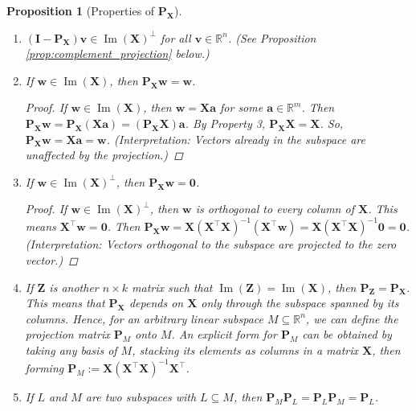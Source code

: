 \documentclass[11pt, a4paper]{article}
\DeclareMathOperator{\Image}{\mathrm{Im}}        %
\newtheorem{proposition}[theorem]{Proposition}
\theoremstyle{definition}
\theoremstyle{remark}
\newcommand{\RR}{\mathbb{R}}             %
\newcommand{\mat}[1]{\mathbf{#1}}       %
\newcommand{\vect}[1]{\bm{#1}}          %
\newcommand{\transpose}{^{\top}}        %
\begin{document}
\begin{proposition}[Properties of $\mat{P}_{\mat{X}}$]
\begin{enumerate}
\begin{proof}
        (Interpretation: If the columns of $\mat{X}$ span the entire space $\RR^n$, projecting onto that space leaves every vector unchanged.)
        \end{proof}
    \item $(\mat{I} - \mat{P}_{\mat{X}}) \vect{v} \in \Image(\mat{X})^{\perp}$ for all $\vect{v} \in \RR^n$. (See Proposition \ref{prop:complement_projection} below.)
    \item If $\vect{w} \in \Image(\mat{X})$, then $\mat{P}_{\mat{X}} \vect{w} = \vect{w}$.
        \begin{proof} %
        If $\vect{w} \in \Image(\mat{X})$, then $\vect{w} = \mat{X}\vect{a}$ for some $\vect{a} \in \RR^m$. Then $\mat{P}_{\mat{X}}\vect{w} = \mat{P}_{\mat{X}}(\mat{X}\vect{a}) = (\mat{P}_{\mat{X}}\mat{X})\vect{a}$. By Property 3, $\mat{P}_{\mat{X}}\mat{X} = \mat{X}$. So, $\mat{P}_{\mat{X}}\vect{w} = \mat{X}\vect{a} = \vect{w}$.
        (Interpretation: Vectors already in the subspace are unaffected by the projection.)
        \end{proof} %
    \item If $\vect{w} \in \Image(\mat{X})^{\perp}$, then $\mat{P}_{\mat{X}} \vect{w} = \vect{0}$.
        \begin{proof} If $\vect{w} \in \Image(\mat{X})^{\perp}$, then $\vect{w}$ is orthogonal to every column of $\mat{X}$. This means $\mat{X}\transpose \vect{w} = \vect{0}$. Then $\mat{P}_{\mat{X}}\vect{w} = \mat{X} (\mat{X}\transpose \mat{X})^{-1} (\mat{X}\transpose \vect{w}) = \mat{X} (\mat{X}\transpose \mat{X})^{-1} \vect{0} = \vect{0}$.
        (Interpretation: Vectors orthogonal to the subspace are projected to the zero vector.)
        \end{proof}
    \item If $\mat{Z}$ is another $n \times k$ matrix such that $\Image(\mat{Z}) = \Image(\mat{X})$, then $\mat{P}_{\mat{Z}} = \mat{P}_{\mat{X}}$. This means that $\mat{P}_{\mat{X}}$ depends on $\mat{X}$ only through the subspace spanned by its columns. Hence, for an arbitrary linear subspace $M \subseteq \RR^n$, we can define the projection matrix $\mat{P}_{M}$ onto $M$. An explicit form for $\mat{P}_{M}$ can be obtained by taking any basis of $M$, stacking its elements as columns in a matrix $\mat{X}$, then forming $\mat{P}_{M} := \mat{X}(\mat{X}\transpose \mat{X})^{-1}\mat{X}\transpose$.
    \item If $L$ and $M$ are two subspaces with $L \subseteq M$, then $\mat{P}_{M} \mat{P}_{L} = \mat{P}_{L} \mat{P}_{M} = \mat{P}_{L}$.

\end{enumerate}
\end{proposition}
\end{document}
